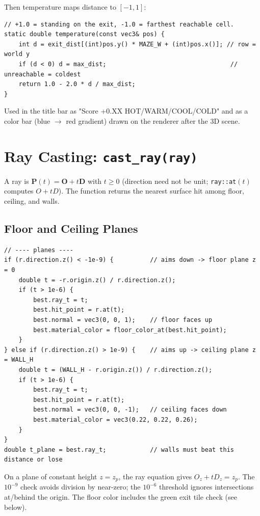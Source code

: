 Then temperature maps distance to $[-1, 1]$:
\begin{verbatim}
// +1.0 = standing on the exit, -1.0 = farthest reachable cell.
static double temperature(const vec3& pos) {
    int d = exit_dist[(int)pos.y() * MAZE_W + (int)pos.x()]; // row = world y
    if (d < 0) d = max_dist;                                  // unreachable = coldest
    return 1.0 - 2.0 * d / max_dist;
}
\end{verbatim}
Used in the title bar as "Score +0.XX HOT/WARM/COOL/COLD" and as a color bar (blue $\to$ red gradient) drawn on the renderer after the 3D scene.

\section{Ray Casting: \texttt{cast\_ray(ray)}}

A ray is $\mathbf{P}(t)=\mathbf{O}+t\mathbf{D}$ with $t \ge 0$ (direction need not be unit; \texttt{ray::at}$(t)$ computes $O + t D$). The function returns the nearest surface hit among floor, ceiling, and walls.

\subsection{Floor and Ceiling Planes}
\begin{verbatim}
// ---- planes ----
if (r.direction.z() < -1e-9) {          // aims down -> floor plane z = 0
    double t = -r.origin.z() / r.direction.z();
    if (t > 1e-6) {
        best.ray_t = t;
        best.hit_point = r.at(t);
        best.normal = vec3(0, 0, 1);    // floor faces up
        best.material_color = floor_color_at(best.hit_point);
    }
} else if (r.direction.z() > 1e-9) {    // aims up -> ceiling plane z = WALL_H
    double t = (WALL_H - r.origin.z()) / r.direction.z();
    if (t > 1e-6) {
        best.ray_t = t;
        best.hit_point = r.at(t);
        best.normal = vec3(0, 0, -1);   // ceiling faces down
        best.material_color = vec3(0.22, 0.22, 0.26);
    }
}
double t_plane = best.ray_t;            // walls must beat this distance or lose
\end{verbatim}
On a plane of constant height $z=z_p$, the ray equation gives $O_z + t D_z = z_p$. The $10^{-9}$ check avoids division by near-zero; the $10^{-6}$ threshold ignores intersections at/behind the origin. The floor color includes the green exit tile check (see below).

